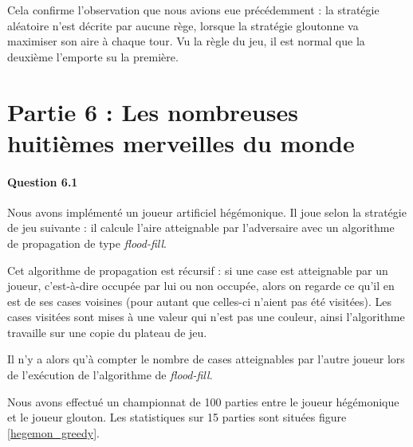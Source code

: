 \documentclass[a4paper]{article}
\begin{document}
Cela confirme l'observation que nous avions eue précédemment : la stratégie 
aléatoire n'est décrite par aucune rège, lorsque la stratégie gloutonne va 
maximiser son aire à chaque tour. Vu la règle du jeu, il est normal que la 
deuxième l'emporte su la première.

    \section{Partie 6 : Les nombreuses huitièmes merveilles du monde}
    \paragraph{Question 6.1}
    Nous avons implémenté un joueur artificiel hégémonique. Il joue selon la 
stratégie de jeu suivante : il calcule l'aire atteignable par l'adversaire avec
un algorithme de propagation de type \emph{flood-fill}.

Cet algorithme de propagation est récursif : si une case est atteignable par un 
joueur, c'est-à-dire occupée par lui ou non occupée, alors on regarde ce qu'il 
en est de ses cases voisines (pour autant que celles-ci n'aient pas été 
visitées). Les cases visitées sont mises à une valeur qui n'est pas une 
couleur, ainsi l'algorithme travaille sur une copie du plateau de jeu.

Il n'y a alors qu'à compter le nombre de cases atteignables par l'autre joueur 
lors de l'exécution de l'algorithme de \emph{flood-fill}.

Nous avons effectué un championnat de 100 parties entre le joueur hégémonique 
et le joueur glouton. Les statistiques sur 15 parties sont situées figure 
\ref{hegemon_greedy}.
\end{document}
